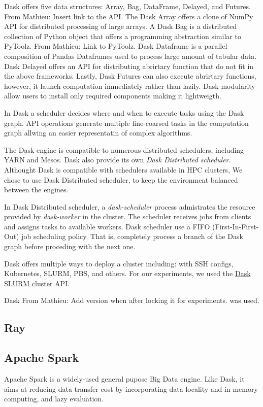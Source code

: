 \documentclass[conference]{IEEEtran}
\newcommand{\MD}[1]{\color{magenta}From Mathieu: #1 \color{black}}
\begin{document}
Dask offers five data structures: Array, Bag, DataFrame, Delayed, and Futures. \MD{Insert link to the API.}
The Dask Array offers a clone of NumPy API for distributed processing of large arrays.
A Dask Bag is a distributed collection of Python object that offers a programming abstraction similar to PyToolz. \MD{Link to PyToolz.}
Dask Dataframe is a parallel composition of Pandas Dataframes used to process large amount of tabular data.
Dask Delayed offers an API for distributing abrirtary function that do not fit in the above frameworks.
Lastly, Dask Futures can also execute abrirtary functions, however, it launch computation immediately rather than lazily.
Dask modularity allow users to install only required components making it lightweigth.

In Dask a scheduler decides where and when to execute tasks using the Dask graph.
API operations generate multiple fine-coarsed tasks in the computation graph allwing an easier representatin of complex algorithms.

The Dask engine is compatible to numerous distributed schedulers, including YARN and Mesos.
Dask also provide its own \textit{Dask Distributed scheduler}.
Althought Dask is compatible with schedulers available in HPC clusters,
We chose to use Dask Distributed scheduler, to keep the environment balanced between the engines.

In Dask Distributed scheduler, a \textit{dask-scheduler} process admistrates the resource provided by \textit{dask-worker} in the cluster.
The scheduler receives jobs from clients and assigns tasks to available workers.
Dask scheduler use a FIFO (First-In-First-Out) job scheduling policy.
That is, completely process a branch of the Dask graph before proceding with the next one.

Dask offers multiple ways to deploy a cluster including: with SSH configs, Kubernetes, SLURM, PBS, and others.
For our experiments, we used the \href{https://jobqueue.dask.org/en/latest/generated/dask_jobqueue.SLURMCluster.html}{Dask SLURM cluster} API.

Dask \MD{Add version when after locking it for experiments.} was used.

\subsection{Ray}

\subsection{Apache Spark}
Apache Spark is a widely-used general pupose Big Data engine.
Like Dask, it aims at reducing data transfer cost by incorporating data locality and in-memory computing, and lazy evaluation.
\end{document}
